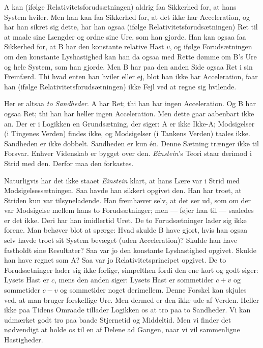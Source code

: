 \documentclass[12pt,a4paper]{article}
\newcommand{\opage}[1]{\marginnote{\footnotesize\textit{[#1]}}}
\begin{document}
A kan (ifølge Relativitetsforudsætningen) aldrig faa Sikkerhed for, at hans
System hviler. Men han kan faa Sikkerhed for, at det ikke har Acceleration,
og har han sikret sig dette, har han ogsaa (ifølge
Relativitetsforudsætningen) Ret til at maale sine Længder og ordne sine
Ure, som han gjorde. Han kan ogsaa faa Sikkerhed for, at B har den
konstante relative Hast $v$, og ifølge Forudsætningen om den konstante
Lyshastighed kan han da ogsaa med Rette dømme om B's Ure og hele System,
som han gjorde. Men B har paa den
\opage{15} anden Side ogsaa Ret i sin Fremfærd. Thi hvad enten han hviler eller ej,
blot han ikke har Acceleration, faar han (ifølge
Relativitetsforudsætningen) ikke Fejl ved at regne sig hvilende.

Her er altsaa \emph{to Sandheder}. A har Ret; thi han har ingen
Acceleration. Og B har ogsaa Ret; thi han har heller ingen Acceleration.
Men dette gaar aabenbart ikke an. Der er i Logikken en Grundsætning, der
siger: A er ikke Ikke-A; Modsigelser (i Tingenes Verden) findes ikke, og
Modsigelser (i Tankens Verden) taales ikke. Sandheden er ikke dobbelt.
Sandheden er kun én. Denne Sætning trænger ikke til Forsvar. Enhver
Videnskab er bygget over den. \emph{Einstein}'s Teori staar derimod i Strid
med den. Derfor maa den forkastes.

Naturligvis har det ikke staaet \emph{Einstein} klart, at hans Lære var i
Strid med Modsigelsessætningen. Saa havde han sikkert opgivet den. Han har
troet, at Striden kun var tilsyneladende. Han fremhæver selv, at det ser
ud, som om der var Modsigelse mellem hans to Forudsætninger; men --- føjer
han til --- saaledes er det ikke. Deri har han imidlertid Uret. De to
Forudsætninger lader sig ikke forene. Man behøver blot at spørge: Hvad
skulde B have gjort, hvis han ogsaa selv havde troet sit System bevæget
(uden Acceleration)? Skulde han have fastholdt sine Resultater? Saa var jo
den konstante Lyshastighed opgivet. Skulde han have regnet som A? Saa var
jo \guillemotleft Relativitetsprincipet\guillemotright{} opgivet. De to
Forudsætninger lader sig ikke forlige, simpelthen fordi den ene kort og
godt siger: Lysets Hast er $c$, mens den anden siger: Lysets Hast er
sommetider $c + v$ og sommetider $c - v$ og sommetider noget derimellem.
Denne Forskel kan skjules ved, at man bruger forskellige Ure. Men dermed er
den ikke ude af Verden. Heller ikke paa Tidens Omraade tillader Logikken os
at tro paa to Sandheder. Vi kan udmærket godt tro paa baade Stjernetid og
Middeltid. Men vi finder det nødvendigt at holde os til en af Delene ad
Gangen, naar vi vil sammenligne Hastigheder.
\end{document}
